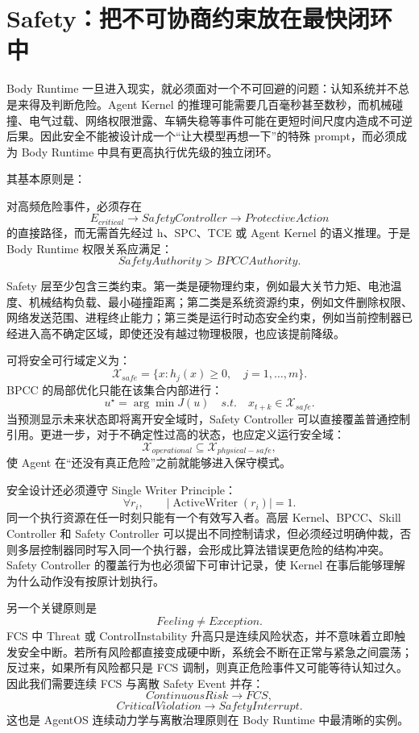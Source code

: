 \section{Safety：把不可协商约束放在最快闭环中}

Body Runtime 一旦进入现实，就必须面对一个不可回避的问题：认知系统并不总是来得及判断危险。Agent Kernel 的推理可能需要几百毫秒甚至数秒，而机械碰撞、电气过载、网络权限泄露、车辆失稳等事件可能在更短时间尺度内造成不可逆后果。因此安全不能被设计成一个“让大模型再想一下”的特殊 prompt，而必须成为 Body Runtime 中具有更高执行优先级的独立闭环。

其基本原则是：
\begin{statementbox}
\centering
{}
\end{statementbox}
对高频危险事件，必须存在
\[
E_{critical}
\rightarrow
SafetyController
\rightarrow
ProtectiveAction
\]
的直接路径，而无需首先经过 h、SPC、TCE 或 Agent Kernel 的语义推理。于是 Body Runtime 权限关系应满足：
\[
\boxed{
SafetyAuthority>BPCCAuthority.
}
\]

Safety 层至少包含三类约束。第一类是硬物理约束，例如最大关节力矩、电池温度、机械结构负载、最小碰撞距离；第二类是系统资源约束，例如文件删除权限、网络发送范围、进程终止能力；第三类是运行时动态安全约束，例如当前控制器已经进入高不确定区域，即使还没有越过物理极限，也应该提前降级。

可将安全可行域定义为：
\[
\mathcal X_{safe}
=
\{
x:
h_j(x)\geq0,\quad j=1,\ldots,m
\}.
\]
BPCC 的局部优化只能在该集合内部进行：
\[
u^\star
=
\arg\min J(u)
\quad
s.t.
\quad
x_{t+k}\in\mathcal X_{safe}.
\]
当预测显示未来状态即将离开安全域时，Safety Controller 可以直接覆盖普通控制引用。更进一步，对于不确定性过高的状态，也应定义运行安全域：
\[
\mathcal X_{operational}
\subseteq
\mathcal X_{physical-safe},
\]
使 Agent 在“还没有真正危险”之前就能够进入保守模式。

安全设计还必须遵守 Single Writer Principle：
\[
\forall r_i,\qquad
|\operatorname{ActiveWriter}(r_i)|=1.
\]
同一个执行资源在任一时刻只能有一个有效写入者。高层 Kernel、BPCC、Skill Controller 和 Safety Controller 可以提出不同控制请求，但必须经过明确仲裁，否则多层控制器同时写入同一个执行器，会形成比算法错误更危险的结构冲突。Safety Controller 的覆盖行为也必须留下可审计记录，使 Kernel 在事后能够理解为什么动作没有按原计划执行。

另一个关键原则是
\[
\boxed{
Feeling\neq Exception.
}
\]
FCS 中 Threat 或 ControlInstability 升高只是连续风险状态，并不意味着立即触发安全中断。若所有风险都直接变成硬中断，系统会不断在正常与紧急之间震荡；反过来，如果所有风险都只是 FCS 调制，则真正危险事件又可能等待认知过久。因此我们需要连续 FCS 与离散 Safety Event 并存：
\[
ContinuousRisk
\rightarrow
FCS,
\]
\[
CriticalViolation
\rightarrow
SafetyInterrupt.
\]
这也是 AgentOS 连续动力学与离散治理原则在 Body Runtime 中最清晰的实例。

